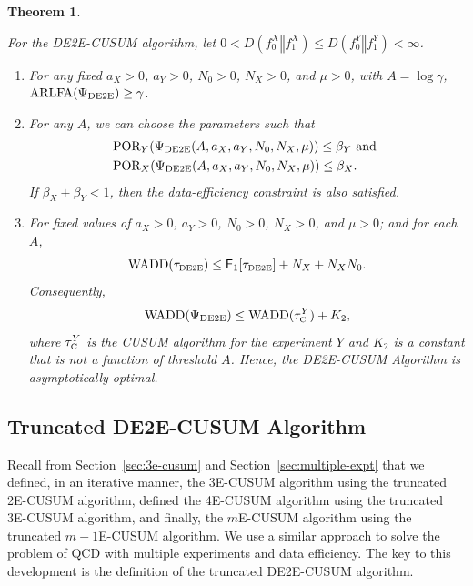 \documentclass[journal, onecolumn]{IEEEtran}
\newtheorem{theorem}{Theorem}
\begin{document}
\begin{theorem}
\label{thm:de2e}

For the \textup{DE2E-CUSUM} algorithm, let $0 < D(f_0^X \mathrel{\Vert} f_1^X) \leq D(f_0^Y \mathrel{\Vert} f_1^Y) < \infty$.

\begin{enumerate}
\item For any fixed $a_X > 0$, $a_Y > 0$, $N_0 > 0$, $N_X > 0$, and $\mu > 0$, with $A = \log \gamma$, $\textup{ARLFA} (\Psi_{\textup{DE2E}}) \geq \gamma$.

\item For any $A$, we can choose the parameters such that
\begin{align*}
& \textup{POR}_Y (\Psi_{\textup{DE2E}} (A, a_X, a_Y, N_0, N_X, \mu)) \leq \beta_Y \text{ and } \\
& \textup{POR}_X (\Psi_{\textup{DE2E}} (A, a_X, a_Y, N_0, N_X, \mu)) \leq \beta_X.
\end{align*}
If $\beta_X + \beta_Y < 1$, then the data-efficiency constraint is also satisfied.

\item For fixed values of $a_X > 0$, $a_Y > 0$, $N_0 > 0$, $N_X > 0$, and $\mu > 0$; and for each $A$,
$$ \textup{WADD} (\tau_{\textup{\fontsize{6 pt}{10 pt}\selectfont DE2E}}) \leq \mathsf{E}_1 [\tau_{\textup{\fontsize{6 pt}{10 pt}\selectfont DE2E}}] + N_X + N_X N_0. $$
Consequently, 
$$ \textup{WADD} (\Psi_{\textup{DE2E}}) \leq \textup{WADD} (\tau_{\textup{\fontsize{6 pt}{10 pt}\selectfont C}}^Y) + K_2, $$
where $\tau_{\textup{\fontsize{6 pt}{10 pt}\selectfont C}}^Y$ is the \textup{CUSUM} algorithm for the experiment $Y$ and $K_2$ is a constant that is not a function of threshold $A$. Hence, the \textup{DE2E-CUSUM} Algorithm is asymptotically optimal.
\end{enumerate}

\end{theorem}






\subsection{Truncated \textup{DE2E-CUSUM} Algorithm}
Recall from Section~\ref{sec:3e-cusum} and Section~\ref{sec:multiple-expt} that we defined, in an iterative manner, the 3E-CUSUM algorithm using the truncated 2E-CUSUM algorithm, defined the 4E-CUSUM algorithm using the truncated 3E-CUSUM algorithm, and finally, the $m$E-CUSUM algorithm using the truncated 
$m-1$E-CUSUM algorithm. We use a similar approach to solve the problem of QCD with multiple experiments and data efficiency. The key to this development is the definition of the truncated DE2E-CUSUM algorithm. 
\end{document}
